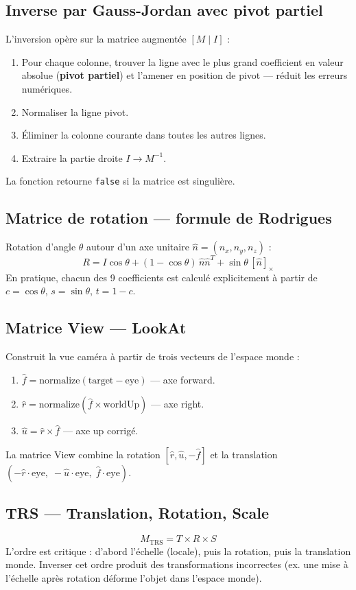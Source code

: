 \documentclass[11pt,a4paper]{article}
\begin{document}
\subsection{Inverse par Gauss-Jordan avec pivot partiel}
L'inversion opère sur la matrice augmentée $[M \mid I]$ :
\begin{enumerate}[noitemsep]
  \item Pour chaque colonne, trouver la ligne avec le plus grand coefficient en valeur absolue
        (\textbf{pivot partiel}) et l'amener en position de pivot — réduit les erreurs numériques.
  \item Normaliser la ligne pivot.
  \item Éliminer la colonne courante dans toutes les autres lignes.
  \item Extraire la partie droite $I \to M^{-1}$.
\end{enumerate}
La fonction retourne \texttt{false} si la matrice est singulière.

\subsection{Matrice de rotation — formule de Rodrigues}
Rotation d'angle $\theta$ autour d'un axe unitaire $\hat{n} = (n_x, n_y, n_z)$ :
\[
  R = I\cos\theta + (1-\cos\theta)\,\hat{n}\hat{n}^T + \sin\theta\,[\hat{n}]_\times
\]
En pratique, chacun des 9 coefficients est calculé explicitement à partir de $c = \cos\theta$,
$s = \sin\theta$, $t = 1-c$.

\subsection{Matrice View — LookAt}
Construit la vue caméra à partir de trois vecteurs de l'espace monde :
\begin{enumerate}[noitemsep]
  \item $\hat{f} = \text{normalize}(\text{target} - \text{eye})$ — axe forward.
  \item $\hat{r} = \text{normalize}(\hat{f} \times \text{worldUp})$ — axe right.
  \item $\hat{u} = \hat{r} \times \hat{f}$ — axe up corrigé.
\end{enumerate}
La matrice View combine la rotation $[\hat{r}, \hat{u}, -\hat{f}]$ et la translation
$(-\hat{r}\cdot\text{eye},\; -\hat{u}\cdot\text{eye},\; \hat{f}\cdot\text{eye})$.

\subsection{TRS — Translation, Rotation, Scale}
\[
  M_{\text{TRS}} = T \times R \times S
\]
L'ordre est critique : d'abord l'échelle (locale), puis la rotation, puis la translation monde.
Inverser cet ordre produit des transformations incorrectes (ex. une mise à l'échelle après rotation
déforme l'objet dans l'espace monde).
\end{document}
